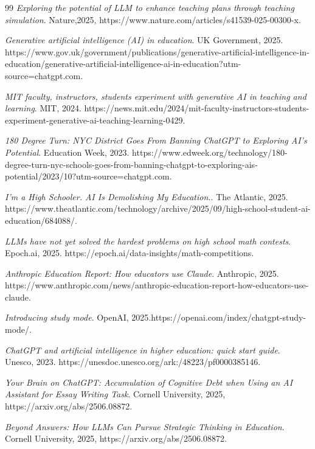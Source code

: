 \documentclass[a4paper,9pt]{article}
\begin{document}
\begin{thebibliography}{99}
	\textit{Exploring the potential of LLM to enhance teaching plans through teaching simulation}. Nature,2025, https://www.nature.com/articles/s41539-025-00300-x.
	
	
	
	\textit{Generative artificial intelligence (AI) in education}. UK Government, 2025. https://www.gov.uk/government/publications/generative-artificial-intelligence-in-education/generative-artificial-intelligence-ai-in-education?utm-source=chatgpt.com.
	
	\textit{MIT faculty, instructors, students experiment with generative AI in teaching and learning}. MIT, 2024. https://news.mit.edu/2024/mit-faculty-instructors-students-experiment-generative-ai-teaching-learning-0429.
	
	\textit{180 Degree Turn: NYC District Goes From Banning ChatGPT to Exploring AI’s Potential}. Education Week, 2023. https://www.edweek.org/technology/180-degree-turn-nyc-schools-goes-from-banning-chatgpt-to-exploring-ais-potential/2023/10?utm-source=chatgpt.com.
	
	\textit{I’m a High Schooler. AI Is Demolishing My Education.}. The Atlantic, 2025. https://www.theatlantic.com/technology/archive/2025/09/high-school-student-ai-education/684088/.
	
	\textit{LLMs have not yet solved the hardest problems on high school math contests}. Epoch.ai, 2025. https://epoch.ai/data-insights/math-competitions.
	
	\textit{Anthropic Education Report: How educators use Claude}. Anthropic, 2025. https://www.anthropic.com/news/anthropic-education-report-how-educators-use-claude.
	
	\textit{Introducing study mode}. OpenAI, 2025.https://openai.com/index/chatgpt-study-mode/.
	
	\textit{ChatGPT and artificial intelligence in higher education: quick start guide}. Unesco, 2023. https://unesdoc.unesco.org/ark:/48223/pf0000385146.
	
	\textit{Your Brain on ChatGPT: Accumulation of Cognitive Debt when Using an AI Assistant for Essay Writing Task}. Cornell University, 2025, https://arxiv.org/abs/2506.08872.
	
	\textit{Beyond Answers: How LLMs Can Pursue Strategic Thinking in Education}. Cornell University, 2025, https://arxiv.org/abs/2506.08872.
	
\end{thebibliography}


			
\end{document}
